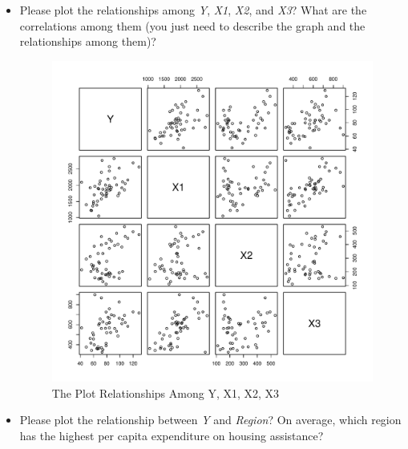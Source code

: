 \documentclass[12pt,letterpaper]{article}
\begin{document}
\vspace{.5cm}
\begin{itemize}

\item
Please plot the relationships among \emph{Y}, \emph{X1}, \emph{X2}, and \emph{X3}? What are the correlations among them (you just need to describe the graph and the relationships among them)?

\begin{figure}[h!]\centering
	\caption{\footnotesize The Plot Relationships Among Y, X1, X2, X3}
	\label{fig:plot_1}
	\includegraphics[width=.85\textwidth]{plot_pairs.pdf}
\end{figure}

 

\vspace{.5cm}
\item
Please plot the relationship between \emph{Y} and \emph{Region}? On average, which region has the highest per capita expenditure on housing assistance?


\end{itemize}
\end{document}
